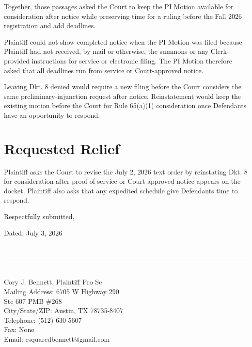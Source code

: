 \documentclass[12pt]{article}
\makeatletter
\providecommand{\FilingPlaintiffName}{Cory J. Bennett}
\providecommand{\FilingPlaintiffMailingLineOne}{6705 W Highway 290}
\providecommand{\FilingPlaintiffMailingLineTwo}{Ste 607 PMB \#268}
\providecommand{\FilingPlaintiffMailingCityStateZip}{Austin, TX 78735-8407}
\providecommand{\FilingPlaintiffTelephone}{(512) 630-5607}
\providecommand{\FilingPlaintiffFax}{None}
\providecommand{\FilingPlaintiffEmail}{csquaredbennett@gmail.com}
\providecommand{\SignatureFourOnLine}[1][]{\FilingPlaintiffName}
\newcommand{\ClarificationMotionDate}{July 3, 2026}
\makeatother
\begin{document}
Together, those passages asked the Court to keep the PI Motion available for consideration after notice while preserving time for a ruling before the Fall 2026 registration and add deadlines.

Plaintiff could not show completed notice when the PI Motion was filed because Plaintiff had not received, by mail or otherwise, the summons or any Clerk-provided instructions for service or electronic filing. The PI Motion therefore asked that all deadlines run from service or Court-approved notice.

Leaving Dkt. 8 denied would require a new filing before the Court considers the same preliminary-injunction request after notice. Reinstatement would keep the existing motion before the Court for Rule 65(a)(1) consideration once Defendants have an opportunity to respond.

\section*{Requested Relief}

Plaintiff asks the Court to revise the July 2, 2026 text order by reinstating Dkt. 8 for consideration after proof of service or Court-approved notice appears on the docket. Plaintiff also asks that any expedited schedule give Defendants time to respond.

\singlespacing
\vspace{0.25em}
\noindent Respectfully submitted,

\vspace{0.5em}
\noindent Dated: \ClarificationMotionDate

\vspace{0.5em}
\noindent\makebox[3.2in][l]{\SignatureFourOnLine[width=1.5in]}\\[-0.35em]
\rule{3.2in}{0.4pt}\\
\FilingPlaintiffName, Plaintiff Pro Se\\
Mailing Address: \FilingPlaintiffMailingLineOne\\
\phantom{Mailing Address: }\FilingPlaintiffMailingLineTwo\\
City/State/ZIP: \FilingPlaintiffMailingCityStateZip\\
Telephone: \FilingPlaintiffTelephone\\
Fax: \FilingPlaintiffFax\\
Email: \FilingPlaintiffEmail
\end{document}
